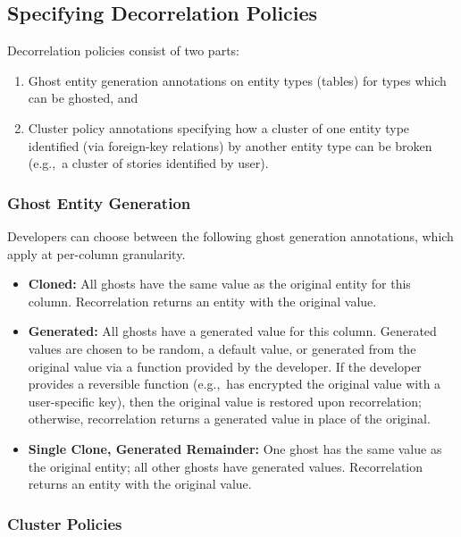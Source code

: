 \subsection{Specifying Decorrelation Policies}

Decorrelation policies consist of two parts: 
\begin{enumerate}
    \item Ghost entity generation annotations on entity types
(tables) for types which can be ghosted, and 
    \item Cluster policy annotations specifying how a cluster of one entity type identified (via
        foreign-key relations) by another entity type can be broken (e.g.,\ a cluster of stories
        identified by user).
\end{enumerate}

\subsubsection{Ghost Entity Generation}
Developers can choose between the following ghost generation annotations, which apply at 
per-column granularity.
\begin{itemize}
    \item \textbf{Cloned:} All ghosts have the same value as the original entity for this column.
        Recorrelation returns an entity with the original value.

    \item \textbf{Generated:} All ghosts have a generated value for this column. Generated values are
chosen to be random, a default value, or generated from the original value via a function provided by the developer.
        If the developer provides a reversible function (e.g.,\ has encrypted the original value
        with a user-specific key), then the original value is restored upon
        recorrelation; otherwise, recorrelation returns a generated value in place of the original.

\item \textbf{Single Clone, Generated Remainder:} One ghost has the same value as the original
        entity; all other ghosts have generated values. Recorrelation returns an entity with the original value.
\end{itemize}

\subsubsection{Cluster Policies}

